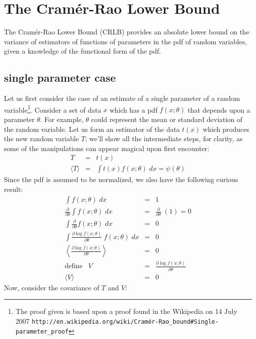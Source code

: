 \chapter{The Cram\'er-Rao Lower Bound}
\label{s:cramer-rao}

The Cram\'er-Rao Lower Bound (CRLB) provides an absolute lower bound
on the variance of estimators of functions of parameters in the pdf of
random variables, given a knowledge of the functional form of the pdf.

\section{single parameter case}

Let us first consider the case of an estimate of a single parameter of a
random variable\footnote{The proof given is based upon a proof
found in the Wikipedia on 14 July 2007
\texttt{http://en.wikipedia.org/wiki/Cram\'er-Rao\_bound\#Single-parameter\_proof}}.
Consider a set of data $x$ which has a pdf $f(x; \theta)$ that depends
upon a parameter $\theta$.  For example, $\theta$ could represent the
mean or standard deviation of the random variable.  Let us form an
estimator of the data $t(x)$ which produces the new random variable
$T$; we'll show all the intermediate steps, for clarity, as some of
the manipulations can appear magical upon first encounter:
\begin{eqnarray}
T &=& t(x) \\
\langle T \rangle &=& \int t(x) f(x; \theta) \; dx = \psi(\theta)
\end{eqnarray}
Since the pdf is assumed to be normalized, we also have the following
curious result:
\begin{eqnarray}
\int f(x; \theta) \; dx &=& 1 \\
\frac{\partial}{\partial \theta} \int f(x; \theta) \; dx &=&
\frac{\partial}{\partial \theta} \; (1) = 0 \\
\int \frac{\partial}{\partial \theta} f(x; \theta) \; dx &=& 0 \\
\int \frac{\partial \log f(x; \theta)}{\partial \theta} \; f(x; \theta)
\; dx &=& 0 \\
\left\langle \frac{\partial \log f(x; \theta)}{\partial \theta} \right\rangle&=& 0 \\
\textrm{define} \;\;\; V &=& \frac{\partial \log f(x ;\theta)}{\partial \theta} \\
\langle V \rangle &=& 0
\end{eqnarray}
Now, consider the covariance of $T$ and $V$:
